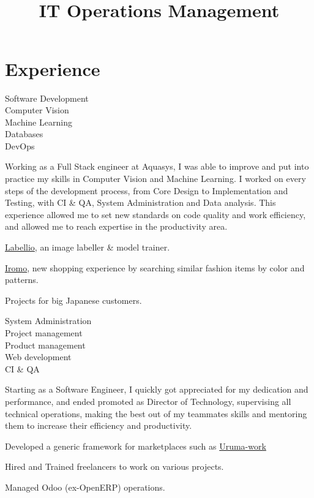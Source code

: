 \documentclass[a4paper,11pt]{cv4tw}%
\title{\\ IT Operations Management}
\begin{document}
\section{Experience}
{Software Development\\Computer Vision\\ Machine Learning\\Databases\\DevOps}
    { Working as a Full Stack engineer at Aquasys, I was able to improve and put
      into practice my skills in Computer Vision and Machine Learning. I
      worked on every steps of the development process, from Core Design to
      Implementation and Testing, with CI \& QA, System Administration and
      Data analysis.
      This experience allowed me to set new standards on code quality and work
      efficiency, and allowed me to reach expertise in the productivity area.
	\begin{missions}
    \item \href{http://www.labell.io/}{Labellio}, an image labeller \& model trainer.
    \item \href{http://iromo.jp}{Iromo}, new shopping experience by
        searching similar fashion items by color and patterns.
    \item Projects for big Japanese customers.
	\end{missions}
}
{System Administration\\Project management\\Product management\\Web development\\CI \& QA}
	{ Starting as a Software Engineer, I quickly got appreciated for my
      dedication and performance, and ended promoted as Director of
      Technology, supervising all technical operations, making the best out of
      my teammates skills and mentoring them to increase their efficiency and
      productivity.
	\begin{missions}
        \item Developed a generic framework for marketplaces such as \href{https://uruma-work.com}{Uruma-work}
        \item Hired and Trained freelancers to work on various projects.
        \item Managed Odoo (ex-OpenERP) operations.
	\end{missions}
}
\end{document}
